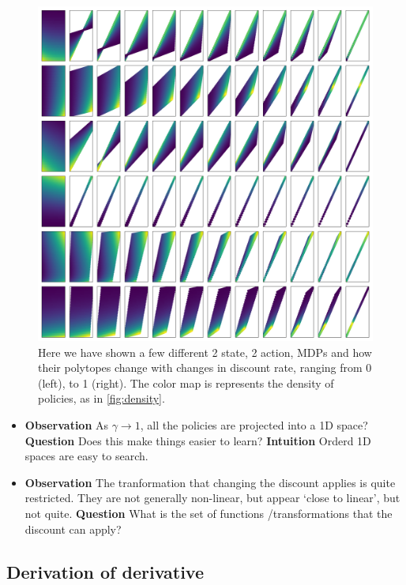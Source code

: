 \begin{figure}
\centering
\includegraphics[width=1\textwidth,height=1\textheight]{../../pictures/figures/discounts.png}
\caption{Here we have shown a few different 2 state, 2 action, MDPs and how
their polytopes change with changes in discount rate, ranging from 0 (left), to 1 (right).
The color map is represents the density of policies, as in \ref{fig:density}.}
\label{fig:polytope-discounts}
\end{figure}

\begin{itemize}
\item
  \textbf{Observation} As \(\gamma \to 1\), all the policies are
  projected into a 1D space? \textbf{Question} Does this make things
  easier to learn? \textbf{Intuition} Orderd 1D spaces are easy to
  search.
\item
  \textbf{Observation} The tranformation that changing the discount
  applies is quite restricted. They are not generally non-linear, but
  appear `close to linear', but not quite. \textbf{Question} What is the
  set of functions /transformations that the discount can apply?
\end{itemize}

\subsection{Derivation of derivative}

